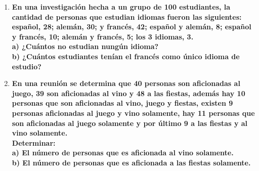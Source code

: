 \documentclass[12pt]{article}
\begin{document}
\begin{enumerate}
            \item \textbf{En una investigación hecha a un grupo de 100 estudiantes, la cantidad de personas que estudian idiomas fueron las siguientes: español, 28; alemán, 30; y francés, 42; español y alemán, 8; español y francés, 10; alemán y francés, 5; los 3 idiomas, 3.\\a) ¿Cuántos no estudian nungún idioma?\\b) ¿Cuántos estudiantes tenían el francés como único idioma de estudio?}
            \item \textbf{En una reunión se determina que 40 personas son aficionadas al juego, 39 son aficionadas al vino y 48 a las fiestas, además hay 10 personas que son aficionadas al vino, juego y fiestas, existen 9 personas aficionadas al juego y vino solamente, hay 11 personas que son aficionadas al juego solamente y por último 9 a las fiestas y al vino solamente.\\Determinar:\\a) El número de personas que es aficionada al vino solamente.\\b) El número de personas que es aficionada a las fiestas solamente.}
        \end{enumerate}
\end{document}
